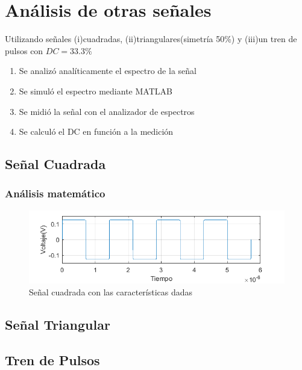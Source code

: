\chapter{Análisis de otras señales}
Utilizando señales (i)cuadradas, (ii)triangulares(simetría 50\%) y (iii)un tren de pulsos con $DC=33.3\%$
\begin{enumerate}
    \item Se analizó analíticamente el espectro de la señal
    \item Se simuló el espectro mediante MATLAB
    \item Se midió la señal con el analizador de espectros
    \item Se calculó el DC en función a la medición
\end{enumerate}

\section{Señal Cuadrada}
    \subsection{Análisis matemático}

    \begin{figure}[h]
        \begin{center}
            \includegraphics[width=\linewidth]{contenido/img/sig_sqr.png}
            \caption{Señal cuadrada con las características dadas}
            \label{fig:2,1,1}
        \end{center}
    \end{figure}

\section{Señal Triangular}

\section{Tren de Pulsos}